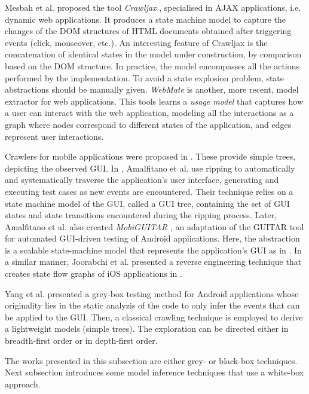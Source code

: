 Mesbah et al. proposed the tool \textit{Crawljax}
\cite{crawljax:tweb12}, specialised in AJAX applications, i.e.
dynamic web applications.  It produces a state machine model to
capture the changes of the DOM structures of HTML documents
obtained after triggering events (click, mouseover, etc.). An
interesting feature of Crawljax is the concatenation of identical
states in the model under construction, by comparison based on
the DOM structure. In practice, the model encompasses all the
actions performed by the implementation. To avoid a state
explosion problem, state abstractions should be manually given.
\textit{WebMate} \cite{webmate12} is another, more recent, model
extractor for web applications. This tools learns a \textit{usage
model} that captures how a user can interact with the web
application, modeling all the interactions as a graph where
nodes correspond to different states of the application, and
edges represent user interactions.

Crawlers for mobile applications were proposed in
\cite{Amalfitano:2012:UGR:2351676.2351717,Joorabchi:2012:REI:2420240.2420457,MobiGUITARIEEESoftware2014}.
These provide simple trees, depicting the observed GUI. In
\cite{Amalfitano:2012:UGR:2351676.2351717}, Amalfitano et al. use
ripping to automatically and systematically traverse the
application's user interface, generating and executing test cases
as new events are encountered. Their technique relies on a state
machine model of the GUI, called a GUI tree, containing the set
of GUI states and state transitions encountered during the
ripping process.  Later, Amalfitano et al. also created
\textit{MobiGUITAR} \cite{MobiGUITARIEEESoftware2014}, an
adaptation of the GUITAR tool for automated GUI-driven testing of
Android applications. Here, the abstraction is a scalable
state-machine model that represents the application's GUI as in
\cite{Amalfitano:2012:UGR:2351676.2351717}. In a similar manner,
Joorabchi et al. presented a reverse engineering technique that
creates state flow graphs of iOS applications in
\cite{Joorabchi:2012:REI:2420240.2420457}.

Yang et al. \cite{WPX13} presented a grey-box testing method for
Android applications whose originality lies in the static
analyzis of the code to only infer the events that can be applied
to the GUI. Then, a classical crawling technique is employed to
derive a lightweight models (simple trees). The exploration can
be directed either in breadth-first order or in depth-first
order.

The works presented in this subsection are either grey- or black-box
techniques. Next subsection introduces some model inference
techniques that use a white-box approach.


